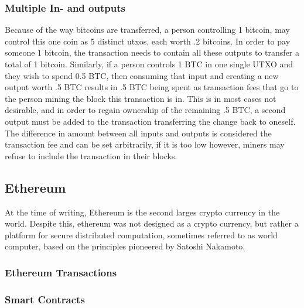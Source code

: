 \documentclass[12pt,msc,a4paper,oneside]{ucl_thesis}
\begin{document}
\subsubsection{Multiple In- and outputs} \label{sec:background_bitcoin:multiple_in_out}
Because of the way bitcoins are transferred, a person controlling 1 bitcoin, may control this one coin as 5 distinct utxos, each worth .2 bitcoins. In order to pay someone 1 bitcoin, the transaction needs to contain all these outputs to transfer a total of 1 bitcoin. Similarly, if a person controls 1 BTC in one single UTXO and they wish to spend 0.5 BTC, then consuming that input and creating a new output worth .5 BTC results in .5 BTC being spent as transaction fees that go to the person mining the block this transaction is in. This is in most cases not desirable, and in order to regain ownership of the remaining .5 BTC, a second output must be added to the transaction transferring the change back to oneself. The difference in amount between all inputs and outputs is considered the transaction fee and can be set arbitrarily, if it is too low however, miners may refuse to include the transaction in their blocks. \cite{bitcoin:satoshi}


\subsection{Ethereum} \label{sec:background_ethereum}
At the time of writing, Ethereum is the second larges crypto currency in the world. Despite this, ethereum was not designed as a crypto currency, but rather a platform for secure distributed computation, sometimes referred to as world computer, based on the principles pioneered by Satoshi Nakamoto.
\subsubsection{Ethereum Transactions}
\subsubsection{Smart Contracts}
\end{document}
